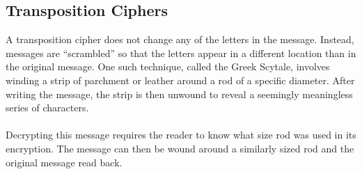 			\subsection*{Transposition Ciphers}
				A transposition cipher does not change any of the letters in the message. Instead, messages are ``scrambled'' so that the letters appear in a different location than in the original message. One such technique, called the Greek Scytale, involves winding a strip of parchment or leather around a rod of a specific diameter. After writing the message, the strip is then unwound to reveal a seemingly meaningless series of characters.\\[\baselineskip]
				\ \\[9pt]
				Decrypting this message requires the reader to know what size rod was used in its encryption. The message can then be wound around a similarly sized rod and the original message read back.

